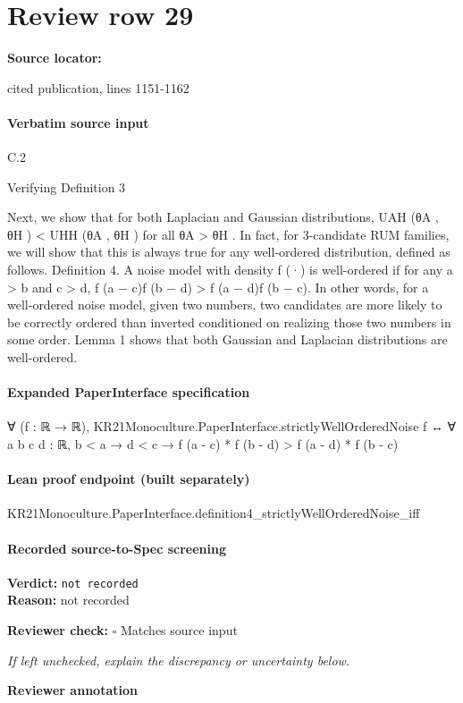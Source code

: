 \documentclass[10pt]{article}
\newcommand{\reviewerbox}{%
  \par\noindent\fbox{\parbox{0.96\linewidth}{\rule{0pt}{0.38in}}}\par
}
\newcommand{\reviewmatch}[1]{%
  \par\noindent\textbf{Reviewer check:} $\square$\; #1\par
  \noindent\emph{If left unchecked, explain the discrepancy or uncertainty below.}\par
}
\begin{document}
\section*{Review row 29}
\textbf{Source locator:} {\footnotesize\raggedright cited publication, lines 1151-\allowbreak{}1162\par}
\paragraph{Verbatim source input}
\begin{ReviewVerbatim}
C.2

Verifying Definition 3

Next, we show that for both Laplacian and Gaussian distributions, UAH (θA , θH ) < UHH (θA , θH ) for all
θA > θH . In fact, for 3-candidate RUM families, we will show that this is always true for any well-ordered
distribution, defined as follows.
Definition 4. A noise model with density f (·) is well-ordered if for any a > b and c > d,
f (a − c)f (b − d) > f (a − d)f (b − c).
In other words, for a well-ordered noise model, given two numbers, two candidates are more likely to be
correctly ordered than inverted conditioned on realizing those two numbers in some order. Lemma 1 shows
that both Gaussian and Laplacian distributions are well-ordered.
\end{ReviewVerbatim}


\paragraph{Expanded PaperInterface specification}
\begin{ReviewVerbatim}
∀ (f : ℝ → ℝ),
  KR21Monoculture.PaperInterface.strictlyWellOrderedNoise f ↔
    ∀ {{a b c d : ℝ}}, b < a → d < c → f (a - c) * f (b - d) > f (a - d) * f (b - c)
\end{ReviewVerbatim}

\paragraph{Lean proof endpoint (built separately)}\begin{ReviewVerbatim}
KR21Monoculture.PaperInterface.definition4_strictlyWellOrderedNoise_iff
\end{ReviewVerbatim}

\paragraph{Recorded source-to-Spec screening}
\textbf{Verdict:} \texttt{not recorded}
\\
\textbf{Reason:} not recorded
\reviewmatch{Matches source input}
\noindent\textbf{Reviewer annotation}\par
\reviewerbox
\clearpage
\hypertarget{source-claim-231c9ba63e6b1424}{}
\end{document}

